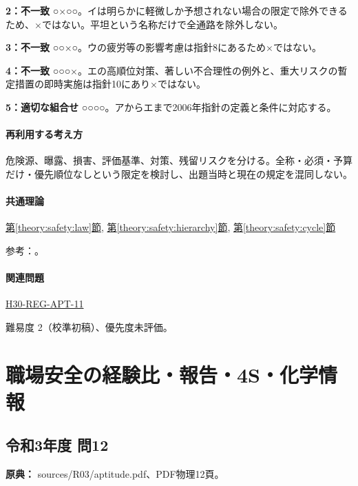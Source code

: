 \noindent\textbf{2：不一致} ○×○○。イは明らかに軽微しか予想されない場合の限定で除外できるため、×ではない。平坦という名称だけで全通路を除外しない。\par

\noindent\textbf{3：不一致} ○○×○。ウの疲労等の影響考慮は指針8にあるため×ではない。\par

\noindent\textbf{4：不一致} ○○○×。エの高順位対策、著しい不合理性の例外と、重大リスクの暫定措置の即時実施は指針10にあり×ではない。\par

\noindent\textbf{5：適切な組合せ} ○○○○。アからエまで2006年指針の定義と条件に対応する。\par

\paragraph{再利用する考え方} 危険源、曝露、損害、評価基準、対策、残留リスクを分ける。全称・必須・予算だけ・優先順位なしという限定を検討し、出題当時と現在の規定を混同しない。

\paragraph{共通理論} \hyperref[theory:safety:law]{第\ref*{theory:safety:law}節}, \hyperref[theory:safety:hierarchy]{第\ref*{theory:safety:hierarchy}節}, \hyperref[theory:safety:cycle]{第\ref*{theory:safety:cycle}節}

\par 参考：\cite{saf_ra2006}。

\paragraph{関連問題} \hyperref[q:h30-reg-apt-11]{H30-REG-APT-11}

\par 難易度 2（校準初稿）、優先度未評価。

\section{職場安全の経験比・報告・4S・化学情報}

\subsection{令和3年度 問12}
\label{q:r03-reg-apt-12}

\noindent\textbf{原典：} sources/R03/aptitude.pdf、PDF物理12頁。

